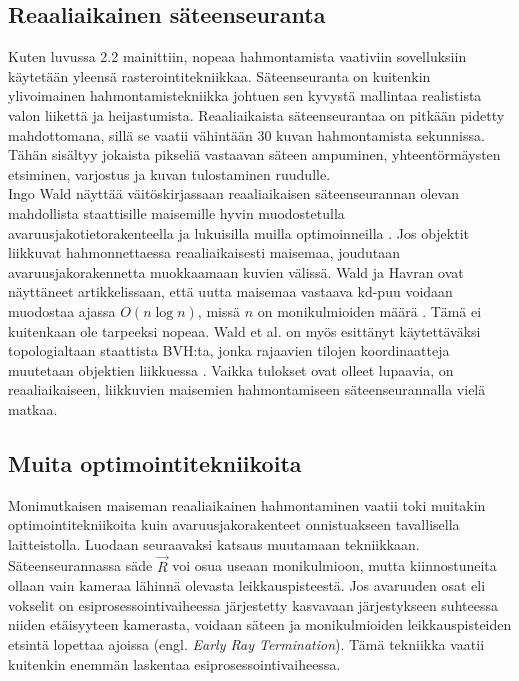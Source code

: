 ﻿\documentclass[a4paper, 12pt, titlepage]{article}
\begin{document}
\subsection{Reaaliaikainen säteenseuranta}

Kuten luvussa 2.2 mainittiin, nopeaa hahmontamista vaativiin sovelluksiin käytetään yleensä rasterointitekniikkaa. Säteenseuranta on kuitenkin ylivoimainen hahmontamistekniikka johtuen sen kyvystä mallintaa realistista valon liikettä ja heijastumista. Reaaliaikaista säteenseurantaa on pitkään pidetty mahdottomana, sillä se vaatii vähintään 30 kuvan hahmontamista sekunnissa. Tähän sisältyy jokaista pikseliä vastaavan säteen ampuminen, yhteentörmäysten etsiminen, varjostus ja kuvan tulostaminen ruudulle. \\

Ingo Wald näyttää väitöskirjassaan reaaliaikaisen säteenseurannan olevan mahdollista staattisille maisemille hyvin muodostetulla avaruusjakotietorakenteella ja lukuisilla muilla optimoinneilla \citep{wald04}. Jos objektit liikkuvat hahmonnettaessa reaaliaikaisesti maisemaa, joudutaan avaruusjakorakennetta muokkaamaan kuvien välissä. Wald ja Havran ovat näyttäneet artikkelissaan, että uutta maisemaa vastaava kd-puu voidaan muodostaa ajassa $O(n \log n)$, missä $n$ on monikulmioiden määrä \citep{wald06}. Tämä ei kuitenkaan ole tarpeeksi nopeaa. Wald et al. on myös esittänyt käytettäväksi topologialtaan staattista BVH:ta, jonka rajaavien tilojen koordinaatteja muutetaan objektien liikkuessa \citep{wald}. Vaikka tulokset ovat olleet lupaavia, on reaaliaikaiseen, liikkuvien maisemien hahmontamiseen säteenseurannalla vielä matkaa. 

\subsection{Muita optimointitekniikoita}

Monimutkaisen maiseman reaaliaikainen hahmontaminen vaatii toki muitakin optimointitekniikoita kuin avaruusjakorakenteet onnistuakseen tavallisella laitteistolla. Luodaan seuraavaksi katsaus muutamaan tekniikkaan.\\

Säteenseurannassa säde $\vec{R}$ voi osua useaan monikulmioon, mutta kiinnostuneita ollaan vain kameraa lähinnä olevasta leikkauspisteestä. Jos avaruuden osat eli vokselit on esiprosessointivaiheessa järjestetty kasvavaan järjestykseen suhteessa niiden etäisyyteen kamerasta, voidaan säteen ja monikulmioiden leikkauspisteiden etsintä lopettaa ajoissa (engl. \emph{Early Ray Termination}). Tämä tekniikka vaatii kuitenkin enemmän laskentaa esiprosessointivaiheessa. \citep{wald04}\\
\end{document}

